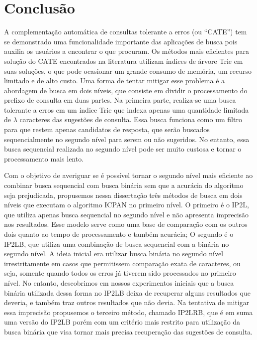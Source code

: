 \section{Conclusão}
\label{sec:conclusion}

A complementação automática de consultas tolerante a erros (ou ``CATE'') tem se demonstrado uma funcionalidade importante das aplicações de busca pois auxilia os usuários a encontrar o que procuram. Os métodos mais eficientes para solução do CATE encontrados na literatura utilizam índices de árvore Trie em suas soluções, o que pode ocasionar um grande consumo de memória, um recurso limitado e de alto custo. Uma forma de tentar mitigar esse problema é a abordagem de busca em dois níveis, que consiste em dividir o processamento do prefixo de consulta em duas partes. Na primeira parte, realiza-se uma busca tolerante a erros em um índice Trie que indexa apenas uma quantidade limitada de $\lambda$ caracteres das sugestões de consulta. Essa busca funciona como um filtro para que restem apenas candidatos de resposta, que serão buscados sequencialmente no segundo nível para serem ou não sugeridos. No entanto, essa busca sequencial realizada no segundo nível pode ser muito custosa e tornar o processamento mais lento. 

Com o objetivo de averiguar se é possível tornar o segundo nível mais eficiente ao combinar busca sequencial com busca binária sem que a acurácia do algoritmo seja prejudicada, propusemos nessa dissertação três métodos de busca em dois níveis que executam o algoritmo  ICPAN no primeiro nível. O primeiro é o IP2L, que utiliza apenas busca sequencial no segundo nível e não apresenta imprecisão nos resultados. Esse modelo serve como uma base de comparação com os outros dois quanto ao tempo de processamento e também acurácia; O segundo é o IP2LB, que utiliza uma combinação de busca sequencial com a binária no segundo nível. A ideia inicial era utilizar busca binária no segundo nível irrestritamente em casos que permitissem comparação exata de caracteres, ou seja, somente quando todos os erros já tiverem sido processados no primeiro nível. No entanto, descobrimos em nossos experimentos iniciais que a busca binária utilizada dessa forma no IP2LB deixa de recuperar alguns resultados que deveria, e também traz outros resultados que não devia. Na tentativa de mitigar essa imprecisão propusemos o terceiro método, chamado IP2LRB, que é em suma uma versão do IP2LB porém com um critério mais restrito para utilização da busca binária que visa tornar mais precisa recuperação das sugestões de consulta.

